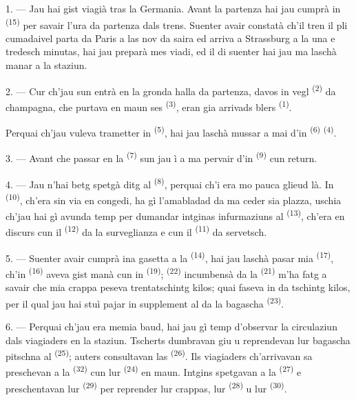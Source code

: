 1. --- Jau hai gist viagià tras la Germania. Avant la partenza hai jau cumprà in
 \textsuperscript{(15)} per savair l'ura da partenza dals trens.
Suenter avair constatà ch'il tren il pli cumadaivel parta da Paris a las nov da
saira ed arriva a Strassburg a la una e tredesch minutas, hai jau preparà mes viadi,
ed il di suenter hai jau ma laschà manar a la staziun.

2. --- Cur ch'jau sun entrà en la gronda halla da partenza, davos in vegl
 \textsuperscript{(2)} da champagna, che purtava en maun ses  \textsuperscript{(3)}, eran gia arrivads blers 
\textsuperscript{(1)}.

Perquai ch'jau vuleva trametter in  \textsuperscript{(5)}, hai jau laschà
mussar a mai d'in  \textsuperscript{(6)} 
\textsuperscript{(4)}.

3. --- Avant che passar en la  \textsuperscript{(7)} sun jau ì a ma
pervair d'in  \textsuperscript{(9)} cun return.

4. --- Jau n'hai betg spetgà ditg al  \textsuperscript{(8)}, perquai ch'i era
mo pauca glieud là. In  \textsuperscript{(10)}, ch'era sin via en congedi, ha
gì l'amabladad da ma ceder sia plazza, uschia ch'jau hai gì avunda temp per dumandar
intginas infurmaziuns al  \textsuperscript{(13)}, ch'era en discurs cun
il  \textsuperscript{(12)} da la surveglianza e cun il 
\textsuperscript{(11)} da servetsch.

\VUsaut{3.0mm}

5. --- Suenter avair cumprà ina gasetta a la  \textsuperscript{(14)}, hai
jau laschà pasar mia  \textsuperscript{(17)}, ch'in 
\textsuperscript{(16)} aveva gist manà cun in  \textsuperscript{(19)};
 \textsuperscript{(22)} incumbensà da la  \textsuperscript{(21)}
m'ha fatg a savair che mia crappa peseva trentatschintg kilos; quai faseva in
 da tschintg kilos, per il qual jau hai stuì pajar in supplement al
 da la bagascha \textsuperscript{(23)}.

6. --- Perquai ch'jau era memia baud, hai jau gì temp d'observar la circulaziun dals
viagiaders en la staziun. Tscherts dumbravan giu u reprendevan lur bagascha pitschna
al  \textsuperscript{(25)}; auters consultavan las
 \textsuperscript{(26)}. Ils viagiaders ch'arrivavan sa preschevan a la
 \textsuperscript{(32)} cun lur  \textsuperscript{(24)} en maun.
Intgins spetgavan a la  \textsuperscript{(27)} e
preschentavan lur  \textsuperscript{(29)} per reprender lur crappas, lur
 \textsuperscript{(28)} u lur  \textsuperscript{(30)}.


